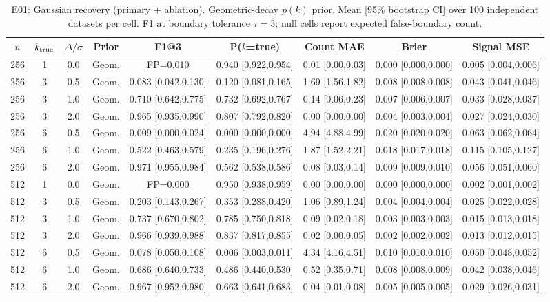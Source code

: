 \begin{table}[!htbp]
\centering
\footnotesize
\caption{E01: Gaussian recovery (primary + ablation). Geometric-decay $p(k)$ prior. Mean [95\% bootstrap CI] over 100 independent datasets per cell. F1 at boundary tolerance $\tau=3$; null cells report expected false-boundary count.}
\label{tab:E01-recovery-paper}
\begin{tabular}{ccccccccc}
\toprule
$n$ & $k_{\rm true}$ & $\Delta/\sigma$ & Prior & F1@3 & P($k$=true) & Count MAE & Brier & Signal MSE \\
\midrule
256 & 1 & 0.0 & Geom. & FP=0.010 & 0.940 [0.922,0.954] & 0.01 [0.00,0.03] & 0.000 [0.000,0.000] & 0.005 [0.004,0.006] \\
256 & 3 & 0.5 & Geom. & 0.083 [0.042,0.130] & 0.120 [0.081,0.165] & 1.69 [1.56,1.82] & 0.008 [0.008,0.008] & 0.043 [0.041,0.046] \\
256 & 3 & 1.0 & Geom. & 0.710 [0.642,0.775] & 0.732 [0.692,0.767] & 0.14 [0.06,0.23] & 0.007 [0.006,0.007] & 0.033 [0.028,0.037] \\
256 & 3 & 2.0 & Geom. & 0.965 [0.935,0.990] & 0.807 [0.792,0.820] & 0.00 [0.00,0.00] & 0.004 [0.003,0.004] & 0.027 [0.024,0.030] \\
256 & 6 & 0.5 & Geom. & 0.009 [0.000,0.024] & 0.000 [0.000,0.000] & 4.94 [4.88,4.99] & 0.020 [0.020,0.020] & 0.063 [0.062,0.064] \\
256 & 6 & 1.0 & Geom. & 0.522 [0.463,0.579] & 0.235 [0.196,0.276] & 1.87 [1.52,2.21] & 0.018 [0.017,0.018] & 0.115 [0.105,0.127] \\
256 & 6 & 2.0 & Geom. & 0.971 [0.955,0.984] & 0.562 [0.538,0.586] & 0.08 [0.03,0.14] & 0.009 [0.009,0.010] & 0.056 [0.051,0.060] \\
\midrule
512 & 1 & 0.0 & Geom. & FP=0.000 & 0.950 [0.938,0.959] & 0.00 [0.00,0.00] & 0.000 [0.000,0.000] & 0.002 [0.001,0.002] \\
512 & 3 & 0.5 & Geom. & 0.203 [0.143,0.267] & 0.353 [0.288,0.420] & 1.06 [0.89,1.24] & 0.004 [0.004,0.004] & 0.025 [0.022,0.028] \\
512 & 3 & 1.0 & Geom. & 0.737 [0.670,0.802] & 0.785 [0.750,0.818] & 0.09 [0.02,0.18] & 0.003 [0.003,0.003] & 0.015 [0.013,0.018] \\
512 & 3 & 2.0 & Geom. & 0.966 [0.939,0.988] & 0.837 [0.817,0.855] & 0.02 [0.00,0.05] & 0.002 [0.002,0.002] & 0.013 [0.012,0.015] \\
512 & 6 & 0.5 & Geom. & 0.078 [0.050,0.108] & 0.006 [0.003,0.011] & 4.34 [4.16,4.51] & 0.010 [0.010,0.010] & 0.050 [0.048,0.052] \\
512 & 6 & 1.0 & Geom. & 0.686 [0.640,0.733] & 0.486 [0.440,0.530] & 0.52 [0.35,0.71] & 0.008 [0.008,0.009] & 0.042 [0.038,0.046] \\
512 & 6 & 2.0 & Geom. & 0.967 [0.952,0.980] & 0.663 [0.641,0.683] & 0.04 [0.01,0.08] & 0.005 [0.005,0.005] & 0.029 [0.026,0.031] \\
\bottomrule
\end{tabular}
\end{table}
